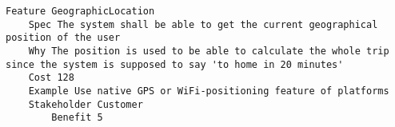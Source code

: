 

\begin{lstlisting}
Feature GeographicLocation
	Spec The system shall be able to get the current geographical position of the user
	Why The position is used to be able to calculate the whole trip since the system is supposed to say 'to home in 20 minutes' 
	Cost 128
	Example Use native GPS or WiFi-positioning feature of platforms
	Stakeholder Customer
		Benefit 5

\end{lstlisting}